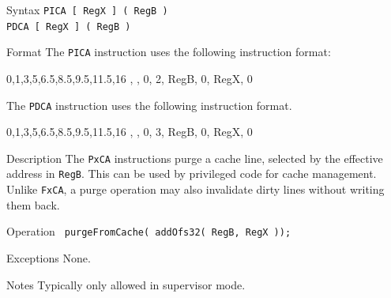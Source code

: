 %
%
\pagebreak
{}

\begin{iPageDescEntry}{Syntax}
    \texttt{PICA [ RegX ] ( RegB )} \\
    \texttt{PDCA [ RegX ] ( RegB )}
\end{iPageDescEntry}

\begin{iPageDescEntry}{Format}
    The \texttt{PICA} instruction uses the following instruction format: \\

    \begin{flushleft}
    \drawInstrFormat
        {0,1,3,5,6.5,8.5,9.5,11.5,16}
        {\OpCodeGrpSYS, \OpCodePCA, 0, 2, RegB, 0, RegX, 0}
    \end{flushleft}
    
    The \texttt{PDCA} instruction uses the following instruction format. \\

    \begin{flushleft}
    \drawInstrFormat
        {0,1,3,5,6.5,8.5,9.5,11.5,16}
        {\OpCodeGrpSYS, \OpCodePCA, 0, 3, RegB, 0, RegX, 0}
    \end{flushleft}
\end{iPageDescEntry}

\begin{iPageDescEntry}{Description}
    The \texttt{PxCA} instructions purge a cache line, selected by the effective address
    in \texttt{RegB}. This can be used by privileged code for cache management. Unlike \texttt{FxCA}, a purge operation may also invalidate dirty lines without writing them back.
   
\end{iPageDescEntry}

\begin{iPageDescEntry}{Operation}
    \texttt{ purgeFromCache( addOfs32( RegB, RegX ));}
\end{iPageDescEntry}

\begin{iPageDescEntry}{Exceptions}
    None.
\end{iPageDescEntry}

\begin{iPageDescEntry}{Notes}
    Typically only allowed in supervisor mode.
\end{iPageDescEntry}
